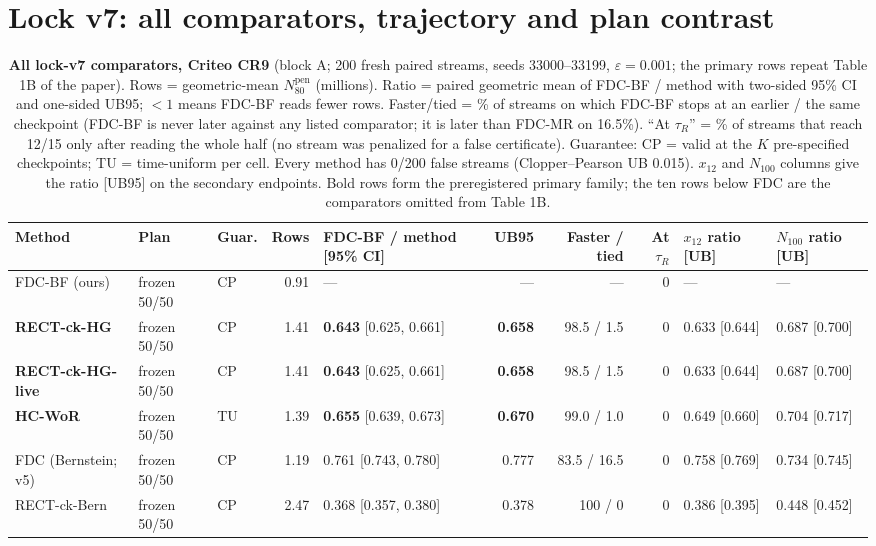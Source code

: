 \documentclass[sigconf,anonymous,review]{acmart}
\newcommand{\eps}{\varepsilon}
\newcommand{\Npen}{N_{80}^{\text{pen}}}
\begin{document}
\clearpage
\section{Lock v7: all comparators, trajectory and plan contrast}\label{app:v7full}



\begin{table}[t]
\caption{\textbf{All lock-v7 comparators, Criteo CR9} (block A; 200 fresh paired streams, seeds 33000--33199, $\eps = 0.001$; the primary rows repeat Table 1B of the paper). Rows = geometric-mean $\Npen$ (millions). Ratio = paired geometric mean of FDC-BF / method with two-sided 95\% CI and one-sided UB95; $<1$ means FDC-BF reads fewer rows. Faster/tied = \% of streams on which FDC-BF stops at an earlier / the same checkpoint (FDC-BF is never later against any listed comparator; it is later than FDC-MR on 16.5\%). ``At $\tau_R$'' = \% of streams that reach 12/15 only after reading the whole half (no stream was penalized for a false certificate). Guarantee: CP = valid at the $K$ pre-specified checkpoints; TU = time-uniform per cell. Every method has 0/200 false streams (Clopper--Pearson UB 0.015). $x_{12}$ and $N_{100}$ columns give the ratio [UB95] on the secondary endpoints. Bold rows form the preregistered primary family; the ten rows below FDC are the comparators omitted from Table 1B.}
\label{tab:fullv7}
\small
\setlength{\tabcolsep}{3.4pt}
\begin{tabular}{@{}lllrlrrrll@{}}
\toprule
Method & Plan & Guar. & Rows & FDC-BF / method [95\% CI] & UB95 & Faster / tied & At $\tau_R$ & $x_{12}$ ratio [UB] & $N_{100}$ ratio [UB] \\
\midrule
FDC-BF (ours) & frozen 50/50 & CP & 0.91 & --- & --- & --- & 0 & --- & --- \\
\textbf{RECT-ck-HG} & frozen 50/50 & CP & 1.41 & \textbf{0.643} [0.625, 0.661] & \textbf{0.658} & 98.5 / 1.5 & 0 & 0.633 [0.644] & 0.687 [0.700] \\
\textbf{RECT-ck-HG-live} & frozen 50/50 & CP & 1.41 & \textbf{0.643} [0.625, 0.661] & \textbf{0.658} & 98.5 / 1.5 & 0 & 0.633 [0.644] & 0.687 [0.700] \\
\textbf{HC-WoR} & frozen 50/50 & TU & 1.39 & \textbf{0.655} [0.639, 0.673] & \textbf{0.670} & 99.0 / 1.0 & 0 & 0.649 [0.660] & 0.704 [0.717] \\
FDC (Bernstein; v5) & frozen 50/50 & CP & 1.19 & 0.761 [0.743, 0.780] & 0.777 & 83.5 / 16.5 & 0 & 0.758 [0.769] & 0.734 [0.745] \\
RECT-ck-Bern & frozen 50/50 & CP & 2.47 & 0.368 [0.357, 0.380] & 0.378 & 100 / 0 & 0 & 0.386 [0.395] & 0.448 [0.452] \\

\end{tabular}
\end{table}
\end{document}
